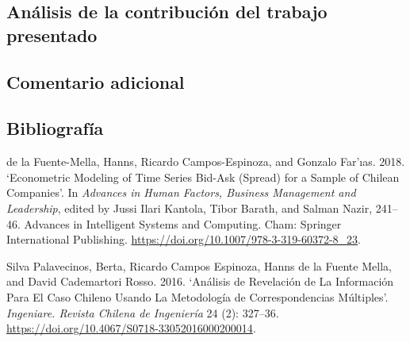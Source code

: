 \documentclass[
  british,
]{article}
\newlength{\cslhangindent}
\newenvironment{cslreferences}%
  {\setlength{\parindent}{0pt}%
  \everypar{\setlength{\hangindent}{\cslhangindent}}\ignorespaces}%
  {\par}
\begin{document}
\hypertarget{anuxe1lisis-de-la-contribuciuxf3n-del-trabajo-presentado}{%
\subsection{Análisis de la contribución del trabajo
presentado}\label{anuxe1lisis-de-la-contribuciuxf3n-del-trabajo-presentado}}

\hypertarget{comentario-adicional}{%
\subsection{Comentario adicional}\label{comentario-adicional}}

\hypertarget{bibliografuxeda}{%
\subsection*{Bibliografía}\label{bibliografuxeda}}

\hypertarget{refs}{}
\begin{cslreferences}
\leavevmode\hypertarget{ref-delafuente-mellaEconometricModelingTime2018}{}%
de la Fuente-Mella, Hanns, Ricardo Campos-Espinoza, and Gonzalo
Far\a'ıas. 2018. `Econometric Modeling of Time Series Bid-Ask (Spread)
for a Sample of Chilean Companies'. In \emph{Advances in Human Factors,
Business Management and Leadership}, edited by Jussi Ilari Kantola,
Tibor Barath, and Salman Nazir, 241--46. Advances in Intelligent Systems
and Computing. Cham: Springer International Publishing.
\url{https://doi.org/10.1007/978-3-319-60372-8_23}.

\leavevmode\hypertarget{ref-silvapalavecinosAnalisisRevelacionInformacion2016}{}%
Silva Palavecinos, Berta, Ricardo Campos Espinoza, Hanns de la Fuente
Mella, and David Cademartori Rosso. 2016. `Análisis de Revelación de La
Información Para El Caso Chileno Usando La Metodología de
Correspondencias Múltiples'. \emph{Ingeniare. Revista Chilena de
Ingeniería} 24 (2): 327--36.
\url{https://doi.org/10.4067/S0718-33052016000200014}.
\end{cslreferences}
\end{document}
